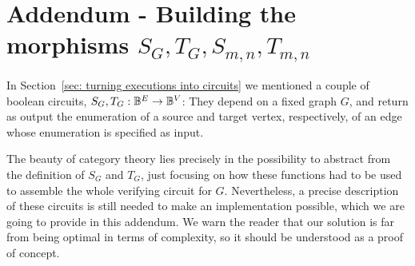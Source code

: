 \section*{Addendum - Building the morphisms $S_G, T_G, S_{m,n}, T_{m,n}$}
%
%
In Section~\ref{sec: turning executions into circuits} we mentioned 
a couple of boolean circuits, $S_G, T_G : \mathbb{B}^E \to \mathbb{B}^V$: 
They depend on a fixed graph $G$, and return 
as output the enumeration of a source and target vertex, respectively, 
of an edge whose enumeration is specified as input.

The beauty of category theory lies precisely in the possibility
 to abstract from the definition of $S_G$ and $T_G$, just focusing 
on how these functions had to be used to assemble the whole verifying 
circuit for $G$. Nevertheless, a precise
description of these circuits is still needed to make an implementation
possible, which we are going to provide in this addendum. We warn the reader 
that our solution is far from being optimal in terms of complexity, so it should be 
understood as a proof of concept.

